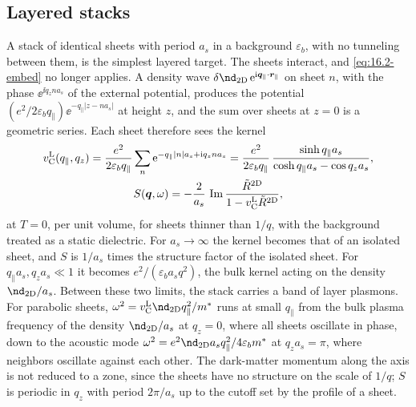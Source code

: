 \subsection{Layered stacks}\label{sec:16.2-stacks}

A stack of identical sheets with period $a_s$ in a background $\varepsilon_b$, with no tunneling between them, is the simplest layered target. The sheets interact, and \cref{eq:16.2-embed} no longer applies. A density wave $\delta\nd_{\mathrm{2D}}\,\ee^{\ii\vect{q}_\parallel\cdot\vect{r}_\parallel}$ on sheet $n$, with the phase $\ee^{\ii q_zna_s}$ of the external potential, produces the potential $(e^2/2\varepsilon_bq_\parallel)\ee^{-q_\parallel|z - na_s|}$ at height $z$, and the sum over sheets at $z = 0$ is a geometric series. Each sheet therefore sees the kernel
\begin{gather}
  v_{\mathrm{C}}^{\mathrm{L}}(q_\parallel,q_z) = \frac{e^2}{2\varepsilon_bq_\parallel}\sum_n\mathrm{e}^{-q_\parallel|n|a_s + \mathrm{i} q_zna_s} = \frac{e^2}{2\varepsilon_bq_\parallel}\,\frac{\sinh q_\parallel a_s}{\cosh q_\parallel a_s - \cos q_za_s} , \notag \\
  S(\bm{q},\omega) = -\frac{2}{a_s}\,\operatorname{Im}\frac{\tilde R^{\mathrm{2D}}}{1 - v_{\mathrm{C}}^{\mathrm{L}}\tilde R^{\mathrm{2D}}} ,
  \label{eq:16.2-sheets}
\end{gather}
at $T = 0$, per unit volume, for sheets thinner than $1/q$, with the background treated as a static dielectric. For $a_s \to \infty$ the kernel becomes that of an isolated sheet, and $S$ is $1/a_s$ times the structure factor of the isolated sheet. For $q_\parallel a_s, q_za_s \ll 1$ it becomes $e^2/(\varepsilon_ba_sq^2)$, the bulk kernel acting on the density $\nd_{\mathrm{2D}}/a_s$. Between these two limits, the stack carries a band of layer plasmons. For parabolic sheets, $\omega^2 = v_{\mathrm{C}}^{\mathrm{L}}\nd_{\mathrm{2D}}q_\parallel^2/m^*$ runs at small $q_\parallel$ from the bulk plasma frequency of the density $\nd_{\mathrm{2D}}/a_s$ at $q_z = 0$, where all sheets oscillate in phase, down to the acoustic mode $\omega^2 = e^2\nd_{\mathrm{2D}}a_sq_\parallel^2/4\varepsilon_bm^*$ at $q_za_s = \pi$, where neighbors oscillate against each other. The dark-matter momentum along the axis is not reduced to a zone, since the sheets have no structure on the scale of $1/q$; $S$ is periodic in $q_z$ with period $2\pi/a_s$ up to the cutoff set by the profile of a sheet.


